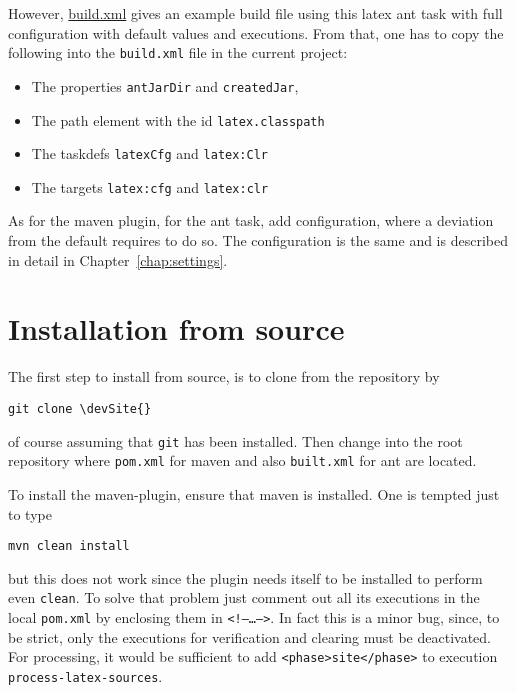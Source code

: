 However, \href{\urlSite build.xml}{build.xml} 
gives an example build file using this latex ant task 
with full configuration with default values and executions.
From that, one has to copy the following
into the \texttt{build.xml} file in the current project:
%
\begin{itemize}
\item The properties \texttt{antJarDir} and \texttt{createdJar}, 
\item The path element with the id \texttt{latex.classpath}
\item The taskdefs \texttt{latexCfg}  and \texttt{latex:Clr}
\item The  targets \texttt{latex:cfg} and \texttt{latex:clr}
\end{itemize}

As for the maven plugin, for the ant task, add configuration, 
where a deviation from the default requires to do so. 
The configuration is the same and is described in detail 
in Chapter~\ref{chap:settings}. 



\section{Installation from source}\label{sec:instSrc}

The first step to install from source, is to clone from the repository by
%
\begin{Verbatim}[commandchars=\\\{\}]
git clone \devSite{}
\end{Verbatim}
%
of course assuming that \texttt{git} has been installed.
Then change into the root repository where \texttt{pom.xml}
for maven and also \texttt{built.xml} for ant are located. 

To install the maven-plugin, ensure that maven is installed. 
One is tempted just to type 
%
\begin{Verbatim}
mvn clean install
\end{Verbatim}
%
but this does not work since the plugin needs itself to be installed
to perform even \texttt{clean}.
To solve that problem just comment out all its executions
in the local \texttt{pom.xml} by enclosing them in \texttt{<!--\ldots-->}.
In fact this is a minor bug, since, to be strict, only
the executions for verification and clearing must be deactivated.
For processing, it would be sufficient to add
\texttt{<phase>site</phase>} to execution \texttt{process-latex-sources}.
\medskip


